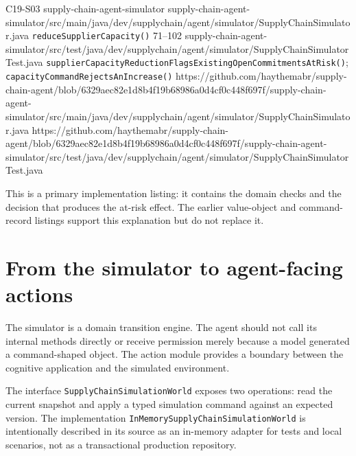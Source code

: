 \begin{minipage}{\linewidth}
\BookSourceReferenceQR
  {C19-S03}
  {supply-chain-agent-simulator}
  {supply-chain-agent-simulator/src/main/java/dev/supplychain/agent/simulator/SupplyChainSimulator.java}
  {\texttt{reduceSupplierCapacity()}}
  {71--102}
  {supply-chain-agent-simulator/src/test/java/dev/supplychain/agent/simulator/SupplyChainSimulatorTest.java}
  {\texttt{supplierCapacityReductionFlagsExistingOpenCommitmentsAtRisk()}; \texttt{capacityCommandRejectsAnIncrease()}}
  {https://github.com/haythemabr/supply-chain-agent/blob/6329aec82e1d8b4f19b68986a0d4cf0c448f697f/supply-chain-agent-simulator/src/main/java/dev/supplychain/agent/simulator/SupplyChainSimulator.java}
  {https://github.com/haythemabr/supply-chain-agent/blob/6329aec82e1d8b4f19b68986a0d4cf0c448f697f/supply-chain-agent-simulator/src/test/java/dev/supplychain/agent/simulator/SupplyChainSimulatorTest.java}
\end{minipage}

This is a primary implementation listing: it contains the domain checks and the decision that produces the at-risk effect. The earlier value-object and command-record listings support this explanation but do not replace it.

\section{From the simulator to agent-facing actions}
\label{sec:ch19-action-boundary}

The simulator is a domain transition engine. The agent should not call its internal methods directly or receive permission merely because a model generated a command-shaped object. The action module provides a boundary between the cognitive application and the simulated environment.

The interface \texttt{SupplyChain\allowbreak{}SimulationWorld} exposes two operations: read the current snapshot and apply a typed simulation command against an expected version. The implementation \texttt{InMemory\allowbreak{}SupplyChain\allowbreak{}SimulationWorld} is intentionally described in its source as an in-memory adapter for tests and local scenarios, not as a transactional production repository.

